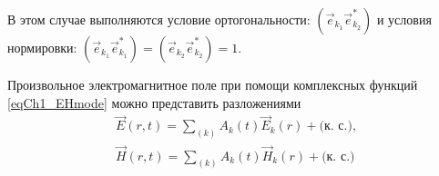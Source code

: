 В этом случае выполняются условие ортогональности:
$\left(\vec{e}_{k_1} \vec{e}_{k_2}^{*}\right)$
и условия нормировки:
$\left(\vec{e}_{k_1} \vec{e}_{k_1}^{*}\right) = \left(\vec{e}_{k_2}
\vec{e}_{k_2}^{*}\right) = 1$.

Произвольное электромагнитное поле при помощи комплексных функций 
\eqref{eqCh1_EHmode} можно представить разложениями 
\begin{eqnarray}
\vec{E}\left(r, t\right) = 
\sum_{(k)} 
A_k\left(t\right) \vec{E}_k\left(r\right) + \mbox{(к. с.)},
\nonumber \\
\vec{H}\left(r, t\right) = 
\sum_{(k)} 
A_k\left(t\right) \vec{H}_k\left(r\right) +
\mbox{(к. с.)}
\end{eqnarray}
